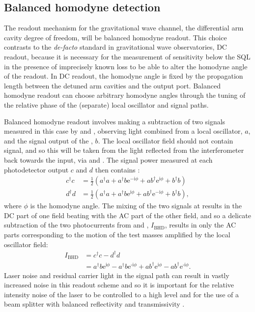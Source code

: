 \subsection{\label{sec:bhd-intro}Balanced homodyne detection}
The readout mechanism for the gravitational wave channel, the differential arm cavity degree of freedom, will be balanced homodyne readout. This choice contrasts to the \emph{de-facto} standard in gravitational wave observatories, \gls{DC} readout, because it is necessary for the measurement of sensitivity below the \gls{SQL} in the presence of imprecisely known loss to be able to alter the homodyne angle of the readout. In \gls{DC} readout, the homodyne angle is fixed by the propagation length between the detuned arm cavities and the output port. Balanced homodyne readout can choose arbitrary homodyne angles through the tuning of the relative phase of the (separate) local oscillator and signal paths.

Balanced homodyne readout involves making a subtraction of two signals measured in this case by \HDA{} and \HDB{}, observing light combined from a local oscillator, $a$, and the signal output of the \SSM{}, $b$. The local oscillator field should not contain signal, and so this will be taken from the light reflected from the interferometer back towards the input, via \MTWELVE{} and \MTHIRTEEN{}. The signal power measured at each photodetector output $c$ and $d$ then contains \cite{Steinlechner2015}:
\begin{equation}
  \begin{split}
    c^{\dag} c &= \frac{1}{2} \left( a^{\dag} a + a^{\dag} b \text{e}^{-\text{i} \phi} + a b^{\dag} \text{e}^{\text{i} \phi} + b^{\dag} b \right) \\
    d^{\dag} d &= \frac{1}{2} \left( a^{\dag} a + a^{\dag} b \text{e}^{\text{i} \phi} + a b^{\dag} \text{e}^{-\text{i} \phi} + b^{\dag} b \right),
  \end{split}
\end{equation}
where $\phi$ is the homodyne angle. The mixing of the two signals at \MSIXTEEN{} results in the \gls{DC} part of one field beating with the \gls{AC} part of the other field, and so a delicate subtraction of the two photocurrents from \HDA{} and \HDB{}, $I_{\text{BHD}}$, results in only the \gls{AC} parts corresponding to the motion of the test masses amplified by the local oscillator field:
\begin{equation}
  \begin{split}
    I_{\text{BHD}} &= c^{\dag} c - d^{\dag} d \\
                   &= a^{\dag} b \text{e}^{\text{i} \phi} - a^{\dag} b \text{e}^{\text{-i} \phi} + a b^{\dag} \text{e}^{\text{i} \phi} - a b^{\dag} \text{e}^{\text{-i} \phi}.
  \end{split}
\end{equation}
Laser noise and residual carrier light in the signal path can result in vastly increased noise in this readout scheme and so it is important for the relative intensity noise of the laser to be controlled to a high level and for the use of a beam splitter with balanced reflectivity and transmissivity \cite{Steinlechner2015}.

